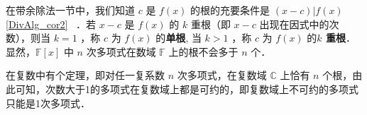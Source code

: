 在带余除法一节中，我们知道 $c$ 是 $f(x)$ 的根的充要条件是 $(x-c)|f(x)$ \autoref{DivAlg_cor2}~ ．若 $x-c$ 是 $f(x)$ 的 $k$ 重根（即 $x-c$ 出现在因式中的次数），则当 $k=1$ ，称 $c$ 为 $f(x)$ 的\textbf{单根}, 当 $k>1$ ，称 $c$ 为 $f(x)$ 的\textbf{$k$ 重根}．显然，$\mathbb{F}[x]$ 中 $n$ 次多项式在数域 $\mathbb{F}$ 上的根不会多于 $n$ 个．

在复数中有个定理，即对任一复系数 $n$ 次多项式，在复数域 $\mathbb{C}$ 上恰有 $n$ 个根，由此可知，次数大于1的多项式在复数域上都是可约的，即复数域上不可约的多项式只能是1次多项式．

